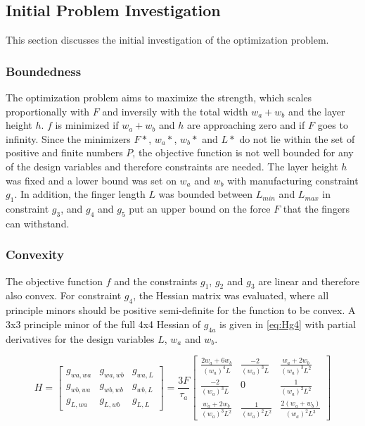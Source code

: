 \subsection{Initial Problem Investigation}
This section discusses the initial investigation of the optimization problem. 

\subsubsection{Boundedness}
The optimization problem aims to maximize the strength, which scales proportionally with $F$ and inversily with the total width $w_a + w_b$ and the layer height $h$.  $f$ is minimized if $w_a + w_b$ and $h$ are approaching zero and if $F$ goes to infinity. Since the minimizers $F*$, $w_a*$, $w_b*$ and $L*$ do not lie within the set of positive and finite numbers $P$, the objective function is not well bounded for any of the design variables and therefore constraints are needed. The layer height $h$ was fixed and a lower bound was set on $w_a$ and $w_b$ with manufacturing constraint $g_1$. In addition, the finger length $L$ was bounded between $L_{min}$ and $L_{max}$ in constraint $g_3$, and $g_4$ and $g_5$ put an upper bound on the force $F$ that the fingers can withstand. 

\subsubsection{Convexity}
The objective function $f$ and the constraints $g_1$, $g_2$ and $g_3$ are linear and therefore also convex. For constraint $g_4$, the Hessian matrix was evaluated, where all principle minors should be positive semi-definite for the function to be convex. A 3x3 principle minor of the full 4x4 Hessian of $g_{4a}$ is given in \autoref{eq:Hg4} with partial derivatives for the design variables $L$, $w_a$ and $w_b$.

\begin{equation}
	\label{eq:Hg4}
	H = \begin{bmatrix}
				 g_{wa, wa} & g_{wa, wb} & g_{wa, L} \\
				 g_{wb, wa} & g_{wb, wb} & g_{wb, L}  \\
				 g_{L, wa} & g_{L, wb} & g_{L, L} 													
		\end{bmatrix}
	= \frac{3F}{\tau_a}\begin{bmatrix}
		\frac{2w_a + 6 w_b}{\left( w_a \right)^4 L} & \frac{-2}{\left( w_a \right)^3 L } &  \frac{w_a + 2 w_b}{\left( w_a \right)^3 L^2 }\\
		\frac{-2}{\left( w_a \right)^3 L } & 0 & \frac{1}{\left( w_a \right)^2 L^2 }  \\
\frac{w_a + 2 w_b}{\left( w_a \right)^3 L^2 } & \frac{1}{\left( w_a \right)^2 L^2 } & \frac{2 \left(w_a + w_b\right)}{\left( w_a \right)^2 L^3}													
	\end{bmatrix}
\end{equation}

